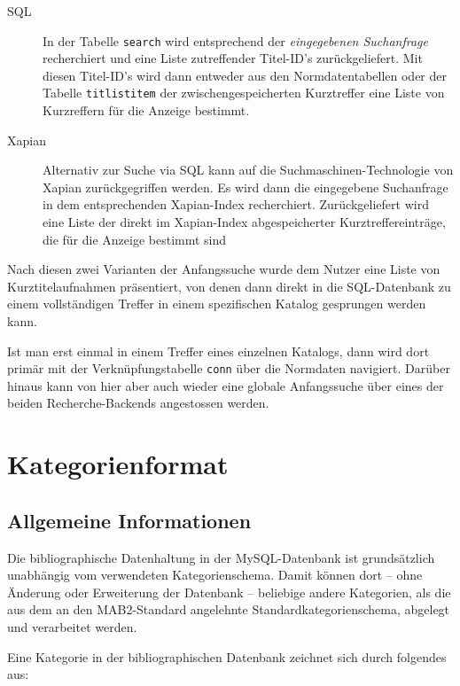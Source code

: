 \documentclass[11pt, twoside, a4paper, BCOR8mm, DIV12, bibtotoc,idxtotoc]{scrbook}
\begin{document}
\begin{description}
\item[SQL] In der Tabelle \texttt{search} wird entsprechend der
  \emph{eingegebenen Suchanfrage} recherchiert und eine Liste
  zutreffender Titel-ID's zurückgeliefert. Mit diesen Titel-ID's
  wird dann entweder aus den Normdatentabellen oder der Tabelle
  \texttt{titlistitem} der
  zwischengespeicherten Kurz\-treffer  eine Liste
  von Kurzreffern für die Anzeige bestimmt.
\item[Xapian] Alternativ zur Suche via SQL kann auf die
  Suchmaschinen-Technologie von Xapian zurückgegriffen werden. Es wird
  dann die eingegebene Suchanfrage in dem entsprechenden Xapian-Index
  recherchiert. Zurückgeliefert wird eine Liste der direkt im
  Xapian-Index abgespeicherter Kurztreffereinträge, die für die
  Anzeige bestimmt sind
\end{description}

Nach diesen zwei Varianten der Anfangssuche wurde dem Nutzer eine
Liste von Kurztitelaufnahmen präsentiert, von denen dann direkt in die
SQL-Datenbank zu einem vollständigen Treffer in einem spezifischen
Katalog gesprungen werden kann.

Ist man erst einmal in einem Treffer eines einzelnen Katalogs, dann
wird dort primär mit der Verknüpfungstabelle \texttt{conn} über die
Normdaten navigiert. Darüber hinaus kann von hier aber auch wieder eine
globale Anfangssuche über eines der beiden Recherche-Backends angestossen
werden.


\section{Kategorienformat}
\subsection{Allgemeine Informationen}
Die bibliographische Datenhaltung in der MySQL-Datenbank ist
grundsätzlich unabhängig vom verwendeten Kategorienschema. Damit
können dort -- ohne Änderung oder Erweiterung der Datenbank --
beliebige andere Kategorien, als die aus dem an den MAB2-Standard angelehnte
Standardkategorien\-schema, abgelegt und verarbeitet werden.

Eine Kategorie in der bibliographischen Datenbank zeichnet sich durch
folgendes aus:
\end{document}

